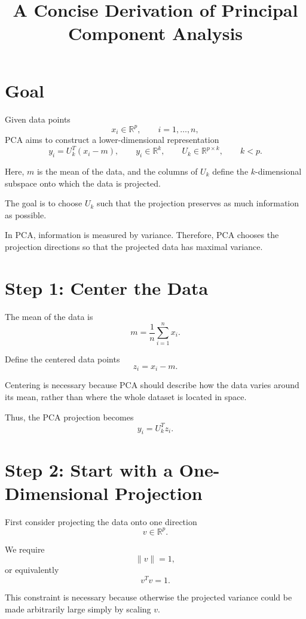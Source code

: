 \documentclass[11pt]{article}
\begin{document}
\title{A Concise Derivation of Principal Component Analysis}
\author{}
\date{}
\maketitle

\section*{Goal}

Given data points
\[
x_i \in \mathbb{R}^p,
\qquad i=1,\dots,n,
\]
PCA aims to construct a lower-dimensional representation
\[
y_i = U_k^T(x_i-m),
\qquad
y_i \in \mathbb{R}^k,
\qquad
U_k \in \mathbb{R}^{p\times k},
\qquad
k < p.
\]

Here, \(m\) is the mean of the data, and the columns of \(U_k\) define the \(k\)-dimensional subspace onto which the data is projected.

The goal is to choose \(U_k\) such that the projection preserves as much information as possible.

In PCA, information is measured by variance. Therefore, PCA chooses the projection directions so that the projected data has maximal variance.

\section*{Step 1: Center the Data}

The mean of the data is
\[
m = \frac{1}{n}\sum_{i=1}^n x_i.
\]

Define the centered data points
\[
z_i = x_i - m.
\]

Centering is necessary because PCA should describe how the data varies around its mean, rather than where the whole dataset is located in space.

Thus, the PCA projection becomes
\[
y_i = U_k^T z_i.
\]

\section*{Step 2: Start with a One-Dimensional Projection}

First consider projecting the data onto one direction
\[
v \in \mathbb{R}^p.
\]

We require
\[
\|v\|=1,
\]
or equivalently
\[
v^T v = 1.
\]

This constraint is necessary because otherwise the projected variance could be made arbitrarily large simply by scaling \(v\).
\end{document}
